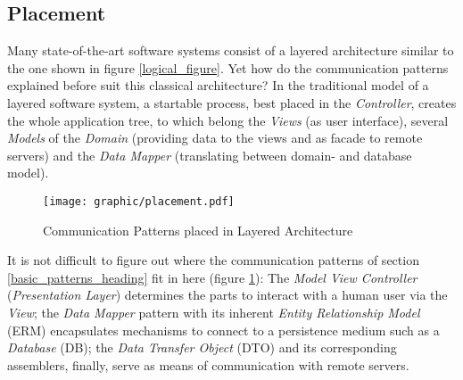 %
%
%
%
%
%
%

\subsection{Placement}
\label{placement_heading}

Many state-of-the-art software systems consist of a layered architecture
similar to the one shown in figure \ref{logical_figure}. Yet how do the
communication patterns explained before suit this classical architecture? In
the traditional model of a layered software system, a startable process, best
placed in the \emph{Controller}, creates the whole application tree, to which
belong the \emph{Views} (as user interface), several \emph{Models} of the
\emph{Domain} (providing data to the views and as facade to remote servers) and
the \emph{Data Mapper} (translating between domain- and database model).

\begin{figure}[ht]
    \begin{center}
        \texttt{[image: graphic/placement.pdf]}
        \caption{Communication Patterns placed in Layered Architecture}
        \label{placement_figure}
    \end{center}
\end{figure}

It is not difficult to figure out where the communication patterns of section
\ref{basic_patterns_heading} fit in here (figure \ref{placement_figure}): The
\emph{Model View Controller} (\emph{Presentation Layer}) determines the parts
to interact with a human user via the \emph{View}; the \emph{Data Mapper}
pattern with its inherent \emph{Entity Relationship Model} (ERM) encapsulates
mechanisms to connect to a persistence medium such as a \emph{Database} (DB);
the \emph{Data Transfer Object} (DTO) and its corresponding assemblers,
finally, serve as means of communication with remote servers.
